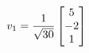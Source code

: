 \documentclass[preview]{standalone}
\begin{document}
\begin{align*}
\special{dvisvgm:raw <g id='unique000'>}v_1 = \frac{1}{\sqrt{30}} \begin{bmatrix} 5 \\ -2 \\ 1 \end{bmatrix}\special{dvisvgm:raw </g>}
\end{align*}
\end{document}
